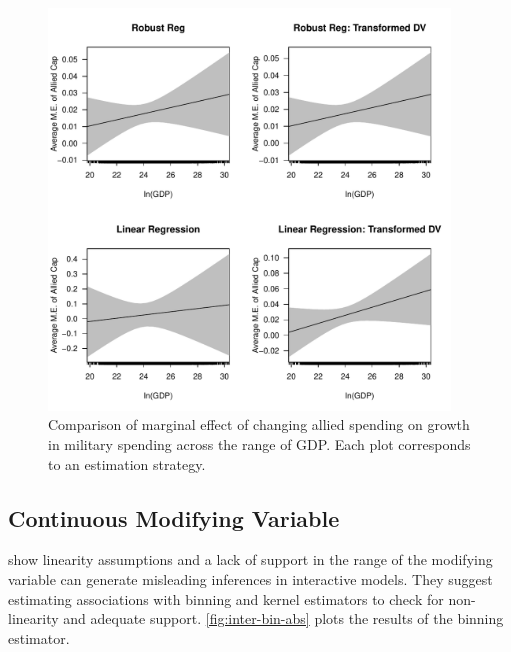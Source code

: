 \documentclass[12pt]{article}
\begin{document}
\begin{figure}[htbp]
	\centering
		\includegraphics[width=0.95\textwidth]{me-plots.pdf}
	\caption{Comparison of marginal effect of changing allied spending on growth in military spending across the range of GDP. Each plot corresponds to an estimation strategy.}
	\label{fig:me-plots}
\end{figure}



\subsection{Continuous Modifying Variable}


\citet{Hainmuelleretal2019} show linearity assumptions and a lack of support in the range of the modifying variable can generate misleading inferences in interactive models. 
They suggest estimating associations with binning and kernel estimators to check for non-linearity and adequate support. 
\autoref{fig:inter-bin-abs} plots the results of the binning estimator. 
\end{document}
